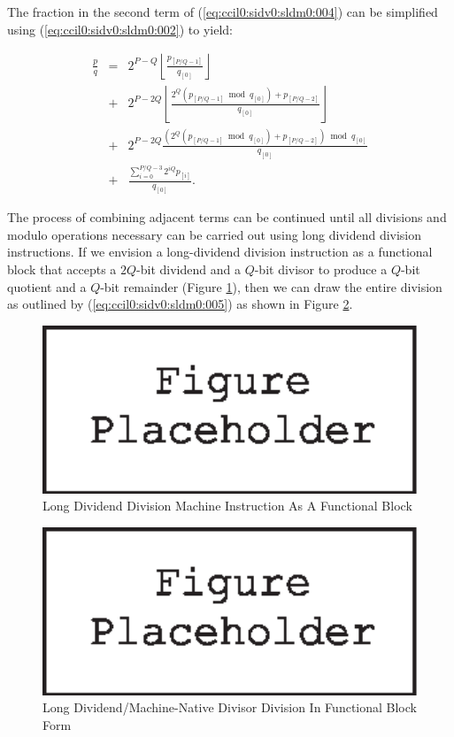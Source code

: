 The fraction in the 
second term of (\ref{eq:ccil0:sidv0:sldm0:004}) can be simplified 
using (\ref{eq:ccil0:sidv0:sldm0:002}) to yield:

\begin{eqnarray}
\nonumber
\frac{p}{q} & = &   2^{P-Q} \left\lfloor{\frac{p_{[P/Q-1]}}{q_{[0]}}}\right\rfloor \\
\label{eq:ccil0:sidv0:sldm0:005}
            & + &   2^{P-2Q} \left\lfloor{\frac{2^Q (p_{[P/Q-1]}\bmod q_{[0]}) + p_{[P/Q-2]}}{q_{[0]}}}\right\rfloor \\
\nonumber   & + &   2^{P-2Q} \frac{(2^Q (p_{[P/Q-1]}\bmod q_{[0]}) + p_{[P/Q-2]}) \bmod q_{[0]}}{q_{[0]}} \\
\nonumber   & + &   \frac{\sum_{i=0}^{P/Q-3} 2^{iQ} p_{[i]}}{q_{[0]}} .
\end{eqnarray}

The process of combining adjacent terms can be continued until all
divisions and modulo operations necessary can be carried out using
long dividend division instructions.  If we envision a 
long-dividend division instruction as a functional block that
accepts a $2Q$-bit dividend and a $Q$-bit divisor to produce a
$Q$-bit quotient and a $Q$-bit remainder
(Figure \ref{fig:ccil0:sidv0:sldm0:00}), then we can draw the
entire division as outlined by (\ref{eq:ccil0:sidv0:sldm0:005})
as shown in Figure \ref{fig:ccil0:sidv0:sldm0:01}.

\begin{figure}
\centering
\includegraphics[width=4.6in]{c_cil0/lddvblk.eps}
\caption{Long Dividend Division Machine Instruction As A Functional Block}
\label{fig:ccil0:sidv0:sldm0:00}
\end{figure}

\begin{figure}
\centering
\includegraphics[width=4.6in]{c_cil0/ldmnblk.eps}
\caption{Long Dividend/Machine-Native Divisor Division In Functional Block Form}
\label{fig:ccil0:sidv0:sldm0:01}
\end{figure}

